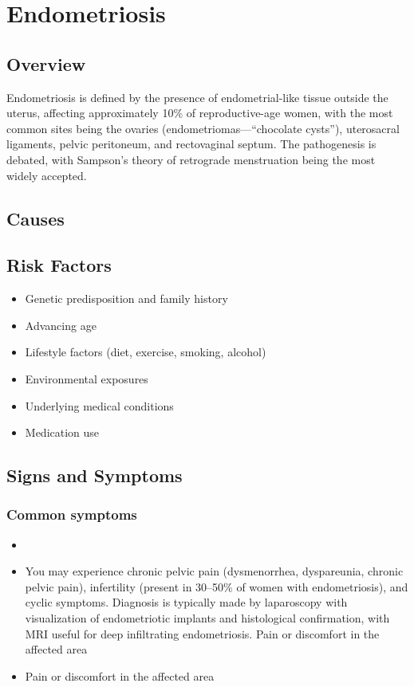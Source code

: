 \chapter{Endometriosis}
\label{sec:Endometriosis}

\section{Overview}
Endometriosis is defined by the presence of endometrial-like tissue outside the uterus, affecting approximately 10\% of reproductive-age women, with the most common sites being the ovaries (endometriomas---``chocolate cysts''), uterosacral ligaments, pelvic peritoneum, and rectovaginal septum. The pathogenesis is debated, with Sampson's theory of retrograde menstruation being the most widely accepted.
\section{Causes}
\section{Risk Factors}

\begin{itemize}[noitemsep]
  \item Genetic predisposition and family history
  \item Advancing age
  \item Lifestyle factors (diet, exercise, smoking, alcohol)
  \item Environmental exposures
  \item Underlying medical conditions
  \item Medication use
\end{itemize}
\section{Signs and Symptoms}

\subsection{Common symptoms}
\begin{itemize}[noitemsep]
  \item \item You may experience chronic pelvic pain (dysmenorrhea, dyspareunia, chronic pelvic pain), infertility (present in 30--50\% of women with endometriosis), and cyclic symptoms. Diagnosis is typically made by laparoscopy with visualization of endometriotic implants and histological confirmation, with MRI useful for deep infiltrating endometriosis. Pain or discomfort in the affected area    \item Pain or discomfort in the affected area
  \end{itemize}

